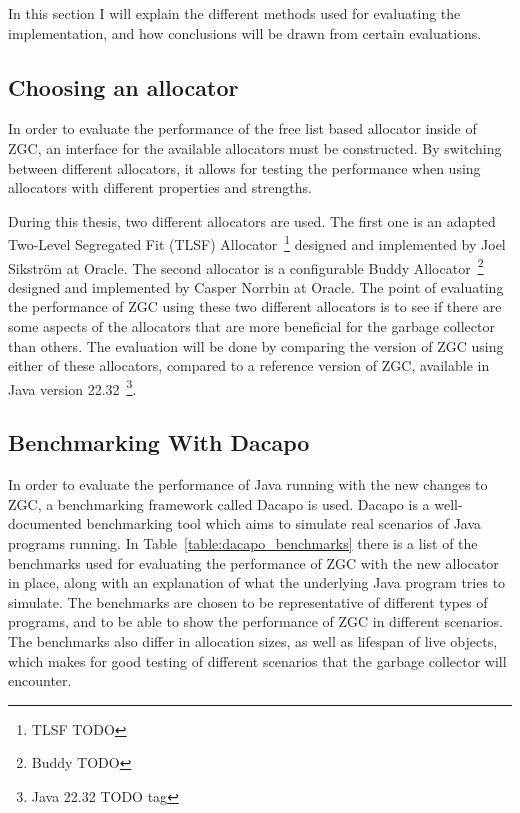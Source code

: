 In this section I will explain the different methods used for evaluating the implementation, and how conclusions will be drawn from certain evaluations.

\subsection{Choosing an allocator}
In order to evaluate the performance of the free list based allocator inside of ZGC, an interface for the available allocators must be constructed. By switching between different allocators, it allows for testing the performance when using allocators with different properties and strengths.

During this thesis, two different allocators are used. The first one is an adapted Two-Level Segregated Fit (TLSF) Allocator~\footnote{TLSF TODO} designed and implemented by Joel Sikström at Oracle. The second allocator is a configurable Buddy Allocator~\footnote{Buddy TODO} designed and implemented by Casper Norrbin at Oracle. The point of evaluating the performance of ZGC using these two different allocators is to see if there are some aspects of the allocators that are more beneficial for the garbage collector than others. The evaluation will be done by comparing the version of ZGC using either of these allocators, compared to a reference version of ZGC, available in Java version 22.32~\footnote{Java 22.32 TODO tag}.

\subsection{Benchmarking With Dacapo}
In order to evaluate the performance of Java running with the new changes to ZGC, a benchmarking framework called Dacapo is used. Dacapo is a well-documented benchmarking tool which aims to simulate real scenarios of Java programs running. In Table~\ref{table:dacapo_benchmarks} there is a list of the benchmarks used for evaluating the performance of ZGC with the new allocator in place, along with an explanation of what the underlying Java program tries to simulate. The benchmarks are chosen to be representative of different types of programs, and to be able to show the performance of ZGC in different scenarios. The benchmarks also differ in allocation sizes, as well as lifespan of live objects, which makes for good testing of different scenarios that the garbage collector will encounter.

